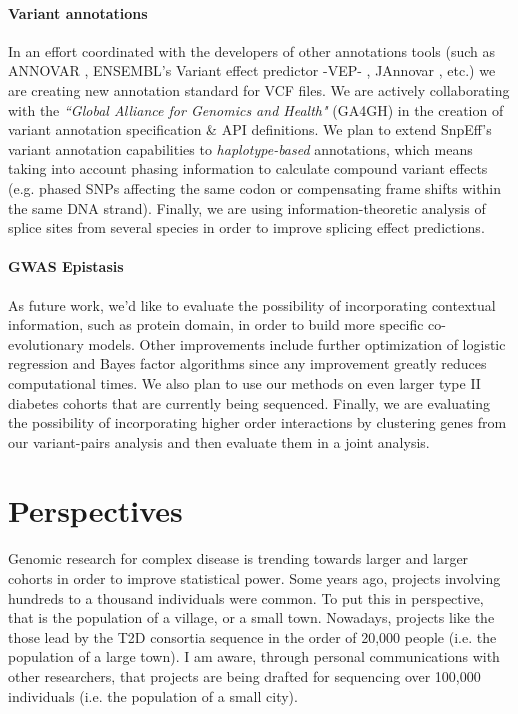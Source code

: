 \paragraph{Variant annotations} In an effort coordinated with the developers of other annotations tools (such as ANNOVAR \cite{wang2010annovar}, ENSEMBL’s Variant effect predictor -VEP- \cite{mclaren2010deriving}, JAnnovar \cite{jager2014jannovar}, etc.) we are creating new annotation standard for VCF files. 
We are actively collaborating with the \textit{``Global Alliance for Genomics and Health"} (GA4GH) in the creation of variant annotation specification \& API definitions. 
We plan to extend SnpEff's variant annotation capabilities to \textit{haplotype-based} annotations, which means taking into account phasing information to calculate compound variant effects (e.g. phased SNPs affecting the same codon or compensating frame shifts within the same DNA strand). 
Finally, we are using information-theoretic analysis of splice sites from several species in order to improve splicing effect predictions.

\paragraph{GWAS Epistasis}
As future work, we'd like to evaluate the possibility of incorporating contextual information, such as protein domain, in order to build more specific co-evolutionary models. 
Other improvements include further optimization of logistic regression and Bayes factor algorithms since any improvement greatly reduces computational times. 
We also plan to use our methods on even larger type II diabetes cohorts that are currently being sequenced. 
Finally, we are evaluating the possibility of incorporating higher order interactions by clustering genes from our variant-pairs analysis and then evaluate them in a joint analysis.

\section{Perspectives}

Genomic research for complex disease is trending towards larger and larger cohorts in order to improve statistical power. 
Some years ago, projects involving hundreds to a thousand individuals were common. 
To put this in perspective, that is the population of a village, or a small town. 
Nowadays, projects like the those lead by the T2D consortia sequence in the order of 20,000 people (i.e. the population of a large town). 
I am aware, through personal communications with other researchers, that projects are being drafted for sequencing over 100,000 individuals (i.e. the population of a small city). 


